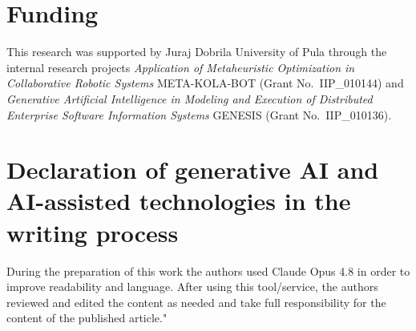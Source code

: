 \section*{Funding}

This research was supported by Juraj Dobrila University of Pula through the
internal research projects \textit{Application of Metaheuristic Optimization in
Collaborative Robotic Systems} META-KOLA-BOT (Grant No.\ IIP\_010144) and
\textit{Generative Artificial Intelligence in Modeling and Execution of
Distributed Enterprise Software Information Systems} GENESIS (Grant
No.\ IIP\_010136).


\section*{Declaration of generative AI and AI-assisted technologies in the writing process}

%
%
During the preparation of this work the authors used Claude Opus 4.8 in order to improve readability and language. After using this tool/service, the authors reviewed and edited the content as needed and take full responsibility for the content of the published article."

